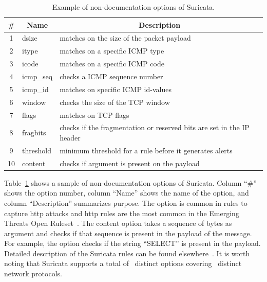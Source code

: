 \documentclass[sigconf,review, anonymous]{acmart}
\begin{document}
\vspace{-1ex}
\begin{table}[h!]
  \footnotesize
  \caption{\label{table:rules}Example of non-documentation options of Suricata.}
  \vspace{-2ex}
  \centering
  \begin{tabular}{clp{5.5cm}}
    \toprule
    \multicolumn{1}{c}{\#} & \multicolumn{1}{c}{Name} &  \multicolumn{1}{c}{Description}\\
    \midrule     
    1 & dsize & matches on the size of the packet payload\\
    2 & itype &  matches on a specific ICMP type\\
    3 & icode & matches on a specific ICMP code\\
    4 & icmp\_seq  & checks a ICMP sequence number\\
    5 & icmp\_id & matches on specific ICMP id-values\\
    6 & window & checks the size of the TCP window\\
    7 & flags & matches on TCP flags\\
    8 & fragbits & checks if the fragmentation or reserved bits are set in the IP header\\
    9 & threshold & minimum threshold for a rule before it generates alerts\\
    10 & content & checks if argument is present on the payload\\
    \bottomrule
  \end{tabular}
\end{table}

Table~\ref{table:rules} shows a sample of non-documentation options of
Suricata. Column ``\#'' shows the option number, column ``Name'' shows
the name of the option, and column ``Description'' summarizes
purpose. The option  is common in rules to capture
http attacks and http rules are the most common in the Emerging
Threats Open Ruleset~\cite{emerging-threats-open}. The content option
takes a sequence of bytes as argument and checks if that sequence is
present in the payload of the message.  For example, the option
 checks if the string ``SELECT'' is present
in the payload.  Detailed description of the Suricata rules can be
found elsewhere~\cite{suri-rule-format}. It is worth noting that
Suricata supports a total of \totoptions\ distinct options covering
\numproto\ distinct network protocols.
\end{document}
